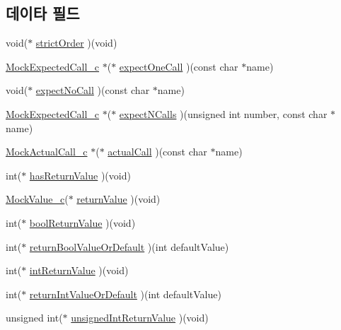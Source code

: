 \subsection*{데이타 필드}
\begin{DoxyCompactItemize}
\item 
void($\ast$ \hyperlink{struct_s_mock_support__c_a1b396b50f529ac32d5374a8fcaf58067}{strict\+Order} )(void)
\item 
\hyperlink{_mock_support__c_8h_a4a6f7402ef6c827e9fe1f32378c1536a}{Mock\+Expected\+Call\+\_\+c} $\ast$($\ast$ \hyperlink{struct_s_mock_support__c_acfa8991e97d6e09876346313d7b6ed39}{expect\+One\+Call} )(const char $\ast$name)
\item 
void($\ast$ \hyperlink{struct_s_mock_support__c_ab9567a3e193ee14b75607837dc2ead84}{expect\+No\+Call} )(const char $\ast$name)
\item 
\hyperlink{_mock_support__c_8h_a4a6f7402ef6c827e9fe1f32378c1536a}{Mock\+Expected\+Call\+\_\+c} $\ast$($\ast$ \hyperlink{struct_s_mock_support__c_a31e99a1a522bc74f1a85d5ed0298e40a}{expect\+N\+Calls} )(unsigned int number, const char $\ast$name)
\item 
\hyperlink{_mock_support__c_8h_a3b5a68f1396a1f65e85a5ff6b54e6bd7}{Mock\+Actual\+Call\+\_\+c} $\ast$($\ast$ \hyperlink{struct_s_mock_support__c_a00af12fd96ffdd7e2f1d9fda6b5bc78d}{actual\+Call} )(const char $\ast$name)
\item 
int($\ast$ \hyperlink{struct_s_mock_support__c_abf2a8673b027d72522a797f0a1c11cf4}{has\+Return\+Value} )(void)
\item 
\hyperlink{_mock_support__c_8h_a31d43adbf229a8eee86044e11318492b}{Mock\+Value\+\_\+c}($\ast$ \hyperlink{struct_s_mock_support__c_ab6bd7926fedfdf87c2a7ac71a1ff6a7c}{return\+Value} )(void)
\item 
int($\ast$ \hyperlink{struct_s_mock_support__c_a5eef7e37626ba5f69b251748055a97e6}{bool\+Return\+Value} )(void)
\item 
int($\ast$ \hyperlink{struct_s_mock_support__c_add9da47e3578bf177c1aa0710d977413}{return\+Bool\+Value\+Or\+Default} )(int default\+Value)
\item 
int($\ast$ \hyperlink{struct_s_mock_support__c_aad818a82edd6c5f9caab3e4b0f57a772}{int\+Return\+Value} )(void)
\item 
int($\ast$ \hyperlink{struct_s_mock_support__c_a781e904090c1ca3ec3b5cf085a10e2bc}{return\+Int\+Value\+Or\+Default} )(int default\+Value)
\item 
unsigned int($\ast$ \hyperlink{struct_s_mock_support__c_a9f27bbb3d4783f56a4b65c909d0117c8}{unsigned\+Int\+Return\+Value} )(void)

\end{DoxyCompactItemize}
